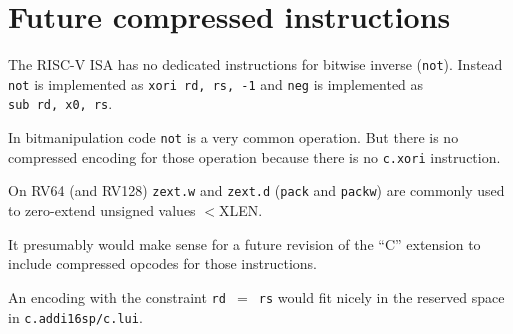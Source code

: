 
\section{Future compressed instructions}

The RISC-V ISA has no dedicated instructions for bitwise inverse (\texttt{not}).
Instead \texttt{not} is implemented as \texttt{xori\ rd,\ rs,\ -1} and
\texttt{neg} is implemented as \texttt{sub\ rd,\ x0,\ rs}.

In bitmanipulation code \texttt{not} is a very common operation. But there is
no compressed encoding for those operation because there is no \texttt{c.xori}
instruction.

On RV64 (and RV128) {\tt zext.w} and {\tt zext.d} ({\tt pack} and {\tt packw})
are commonly used to zero-extend unsigned values $<$XLEN.

It presumably would make sense for a future revision of the ``C'' extension to
include compressed opcodes for those instructions.

An encoding with the constraint \texttt{rd $=$ rs} would fit nicely in the
reserved space in \texttt{c.addi16sp/c.lui}.

